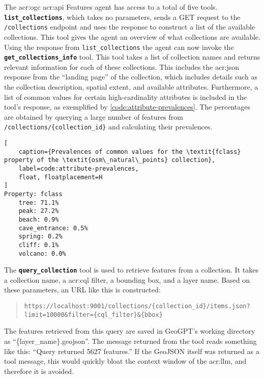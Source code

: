 The \acrshort{acr:ogc} \acrshort{acr:api} Features agent has access to a total of five tools. \textbf{\texttt{list\_collections}}, which takes no parameters, sends a GET request to the \texttt{/collections} endpoint and uses the response to construct a list of the available collections. This tool gives the agent an overview of what collections are available. Using the response from \texttt{list\_collections} the agent can now invoke the \textbf{\texttt{get\_collections\_info}} tool. This tool takes a list of collection names and returns relevant information for each of these collections. This includes the \acrshort{acr:json} response from the \enquote{landing page} of the collection, which includes details such as the collection description, spatial extent, and available attributes. Furthermore, a list of common values for certain high-cardinality attributes is included in the tool's response, as exemplified by \autoref{code:attribute-prevalences}. The percentages are obtained by querying a large number of features from \texttt{/collections/\{collection\_id\}} and calculating their prevalences.

\begin{lstlisting}[
    caption={Prevalences of common values for the \textit{fclass} property of the \textit{osm\_natural\_points} collection},
    label=code:attribute-prevalences,
    float, floatplacement=H
]
Property: fclass
    tree: 71.1%
    peak: 27.2%
    beach: 0.9%
    cave_entrance: 0.5%
    spring: 0.2%
    cliff: 0.1%
    volcano: 0.0%
\end{lstlisting}

The \textbf{\texttt{query\_collection}} tool is used to retrieve features from a collection. It takes a collection name, a \acrshort{acr:cql} filter, a bounding box, and a layer name. Based on these parameters, an URL like this is constructed:

\begin{quote}
    \texttt{https://localhost:9001/collections/\{collection\_id\}/items.json?limit=10000\&filter=\{cql\_filter\}\&\{bbox\}}
\end{quote}

The features retrieved from this query are saved in GeoGPT's working directory as \enquote{\{layer\_name\}.geojson}. The message returned from the tool reads something like this: \enquote{Query returned 5627 features.} If the GeoJSON itself was returned as a tool message, this would quickly bloat the context window of the \acrshort{acr:llm}, and therefore it is avoided.

